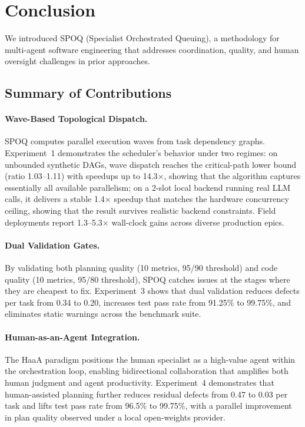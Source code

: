 \section{Conclusion}
\label{sec:conclusion}

We introduced SPOQ (Specialist Orchestrated Queuing), a methodology for
multi-agent software engineering that addresses coordination, quality,
and human oversight challenges in prior approaches.

\subsection{Summary of Contributions}

\paragraph{Wave-Based Topological Dispatch.}
SPOQ computes parallel execution waves from task dependency graphs.
Experiment~1 demonstrates the scheduler's behavior under two regimes:
on unbounded synthetic DAGs, wave dispatch reaches the critical-path
lower bound (ratio 1.03--1.11) with speedups up to 14.3$\times$,
showing that the algorithm captures essentially all available
parallelism; on a 2-slot local backend running real LLM calls, it
delivers a stable 1.4$\times$ speedup that matches the hardware
concurrency ceiling, showing that the result survives realistic
backend constraints. Field deployments report 1.3--5.3$\times$
wall-clock gains across diverse production epics.

\paragraph{Dual Validation Gates.}
By validating both planning quality (10 metrics, 95/90 threshold) and
code quality (10 metrics, 95/80 threshold), SPOQ catches issues at the
stages where they are cheapest to fix. Experiment~3 shows that dual
validation reduces defects per task from 0.34 to 0.20, increases test
pass rate from 91.25\% to 99.75\%, and eliminates static warnings
across the benchmark suite.

\paragraph{Human-as-an-Agent Integration.}
The HaaA paradigm positions the human specialist as a high-value agent
within the orchestration loop, enabling bidirectional collaboration that
amplifies both human judgment and agent productivity. Experiment~4
demonstrates that human-assisted planning further reduces residual
defects from 0.47 to 0.03 per task and lifts test pass rate from 96.5\%
to 99.75\%, with a parallel improvement in plan quality observed under a
local open-weights provider.

